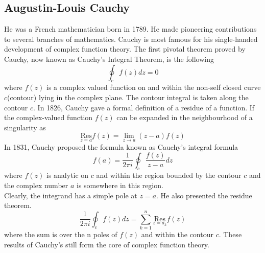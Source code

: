 \documentclass[11pt]{report}
\newcommand{\sps}{\\[0.2cm]}
\newcommand{\NI}{\noindent}
\begin{document}
	\subsection{Augustin-Louis Cauchy}
	He was a French mathematician born in 1789. He made pioneering contributions to several branches of mathematics. Cauchy is most famous for his single-handed development of complex function theory. The first pivotal theorem proved by Cauchy, now known as Cauchy's Integral Theorem, is the following
	\begin{equation}
		\oint_c f(z)dz=0
	\end{equation}
	where $f(z)$ is a complex valued function on and within the non-self closed curve $c$(contour) lying in the complex plane. The contour integral is taken along the contour $c$. In 1826, Cauchy gave a formal definition of a residue of a function. If the complex-valued function $f(z)$ can be expanded in the neighbourhood of a singularity as
	\begin{equation}
		\underset{z=a}{\text{Res}} f(z) = \lim\limits_{z\rightarrow a}(z-a)f(z) 
	\end{equation}
	In 1831, Cauchy proposed the formula known as Cauchy's integral formula
	\begin{equation}
		f(a)=\frac{1}{2\pi i}\oint_c\frac{f(z)}{z-a}dz
	\end{equation}
	where $f(z)$ is analytic on $c$ and within the region bounded by the contour $c$ and the complex number $a$ is somewhere in this region.\sps
	
	\NI Clearly, the integrand has a simple pole at $z=a$. He also presented the residue theorem.
	\begin{equation}
		\frac{1}{2\pi i}\oint_c f(z)dz = \sum_{k=1}^{n}\underset{z=a_k}{\text{Res}}f(z)
	\end{equation}
	where the sum is over the n poles of $f(z)$ and within the contour $c$. These results of Cauchy's still form the core of complex function theory.
	
\end{document}
